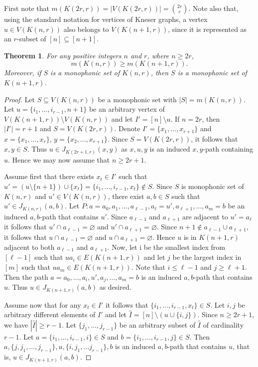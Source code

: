 \documentclass[a4paper,11pt]{article}
\newtheorem{theorem}{Theorem}
\renewcommand{\emptyset}{\varnothing}
\begin{document}
\smallskip

First note that $m(K(2r,r))=|V(K(2r,r))|=\binom{2r}{r}$.
Note also that, using the standard notation for vertices  of Kneser graphs, a vertex $u \in V(K(n,r))$ also belongs to $V(K(n+1,r))$, since it is represented as an $r$-subset of $[n] \subseteq [n+1]$.

\begin{theorem}\label{thm:monotonicity}
    For any positive integers $n$ and $r$, where $n \geq 2r$, $$m(K(n,r)) \geq m(K(n+1,r)).$$ Moreover, if $S$ is a monophonic set of $K(n,r)$, then $S$ is a monophonic set of $K(n+1,r)$.
\end{theorem}
\begin{proof}
    Let $S \subseteq V(K(n,r))$ be a monophonic set with $|S|=m(K(n,r))$. Let $u=\{i_1,\ldots ,i_{r-1},n+1\}$ be an arbitrary vertex of $V(K(n+1,r))\setminus V(K(n,r))$ and let $I'=[n]\setminus u.$ If $n=2r$, then $|I'|=r+1$ and $S=V(K(2r,r))$. Denote $I'=\{x_1,\ldots ,x_{r+1}\}$ and $x=\{x_1,\ldots ,x_r\}$, $y=\{x_2,\ldots , x_{r+1}\}$. Since $S=V(K(2r,r))$, it follows that $x,y \in S$. Thus $u \in J_{K(2r+1,r)}(x,y)$ as $x,u,y$ is an induced $x,y$-path containing $u$. Hence we may now assume that $n \geq 2r+1$. 
    
    Assume first that there exists $x_t \in I'$ such that $u'=(u\setminus \{n+1\})\cup \{x_t\}=\{i_1,\ldots , i_{r-1},x_t\} \notin S$. Since $S$ is monophonic set of $K(n,r)$ and $u' \in V(K(n,r))$, there exist  $a,b \in S$ such that $u'\in J_{K(n,r)}(a,b)$. Let $P:a=a_0,a_1,\ldots ,a_{\ell-1},a_\ell=u',a_{\ell+1},\ldots , a_m=b$ be an induced $a,b$-path that contains $u'$. Since $a_{\ell-1}$ and $a_{\ell+1}$ are adjacent to $u'=a_\ell$ it follows that $u'\cap a_{\ell-1}=\emptyset$ and $u' \cap a_{\ell+1}=\emptyset$. Since $n+1 \notin a_{\ell-1} \cup a_{\ell+1}$, it follows that $u\cap a_{\ell-1}=\emptyset$ and $u \cap a_{\ell+1}=\emptyset$. Hence $u$ is in $K(n+1,r)$ adjacent to both $a_{\ell-1}$ and $a_{\ell+1}$. Now, let i be the smallest index from $[\ell-1]$ such that $ua_i \in E(K(n+1,r))$ and let $j$ be the largest index in $[m]$ such that $ua_m \in E(K(n+1,r))$. Note that $i\leq \ell-1$ and $j \geq \ell+1$. Then the path $a=a_0,\ldots , a_i,u',a_j,\ldots ,a_m=b$ is an induced $a,b$-path that contains $u$. Thus $u \in J_{K(n+1,r)}(a,b)$ as desired.

    Assume now that for any $x_t \in I'$ it follows that $\{i_1,\ldots ,i_{r-1},x_t\} \in S$. Let $i,j$ be arbitrary different elements of $I'$ and let $\hat{I}=[n]\setminus (u \cup \{i,j\})$. Since $n \geq 2r+1$, we have $|\hat{I}| \geq r-1$. Let $\{j_1,\ldots , j_{r-1}\}$ be an arbitrary subset of $\hat{I}$ of cardinality $r-1$. Let $a=\{i_1,\ldots ,i_{r-1},i\} \in S$ and $b=\{i_1,\ldots ,i_{r-1},j\} \in S$. Then $a,\{j,j_1,\ldots ,j_{r-1}\},u,\{i,j_1,\ldots j_{r-1}\}, b$ is an induced $a,b$-path that contains $u$, that is, $u \in J_{K(n+1,r)}(a,b)$.
\end{proof}
\end{document}
